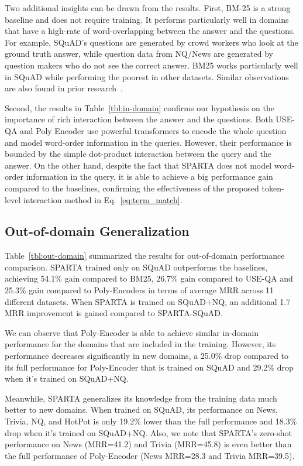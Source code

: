 \documentclass[11pt,a4paper]{article}
\begin{document}
Two additional insights can be drawn from the results. First, BM-25 is a strong baseline and does not require training. It performs particularly well in domains that have a high-rate of word-overlapping between the answer and the questions. For example, SQuAD's questions are generated by crowd workers who look at the ground truth answer, while question data from NQ/News are generated by question makers who do not see the correct answer. BM25 works particularly well in SQuAD while performing the poorest in other datasets. Similar observations are also found in prior research~\cite{ahmad2019reqa}.

Second, the results in Table~\ref{tbl:in-domain} confirms our hypothesis on the importance of rich interaction between the answer and the questions. Both USE-QA and Poly Encoder use powerful transformers to encode the whole question and model word-order information in the queries. However, their performance is bounded by the simple dot-product interaction between the query and the answer. On the other hand, despite the fact that SPARTA does not model word-order information in the query, it is able to achieve a big performance gain compared to the baselines, confirming the effectiveness of the proposed token-level interaction method in Eq.~\ref{eq:term_match}.


\subsection{Out-of-domain Generalization}
Table~\ref{tbl:out-domain} summarized the results for out-of-domain performance comparison. SPARTA trained only on SQuAD outperforms the baselines, achieving 54.1\% gain compared to BM25, 26.7\% gain compared to USE-QA and 25.3\% gain compared to Poly-Encoders in terms of average MRR across 11 different datasets. When SPARTA is trained on SQuAD+NQ, an additional 1.7 MRR improvement is gained compared to SPARTA-SQuAD. 





We can observe that Poly-Encoder is able to achieve similar in-domain performance for the domains that are included in the training. However, its performance decreases significantly in new domains, a 25.0\% drop compared to its full performance for Poly-Encoder that is trained on SQuAD and 29.2\% drop when it's trained on SQuAD+NQ. 

Meanwhile, SPARTA generalizes its knowledge from the training data much better to new domains. When trained on SQuAD, its performance on News, Trivia, NQ, and HotPot is only 19.2\% lower than the full performance and 18.3\% drop when it's trained on SQuAD+NQ. Also, we note that SPARTA's zero-shot performance on News (MRR=41.2) and Trivia (MRR=45.8) is even better than the full performance of Poly-Encoder (News MRR=28.3 and Trivia MRR=39.5). 
\end{document}
